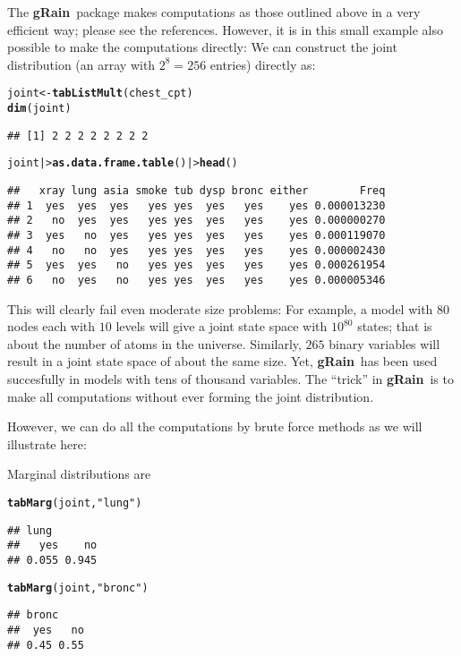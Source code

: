 \documentclass[10pt]{article}\usepackage[]{graphicx}\usepackage[]{xcolor}
\makeatletter
\newcommand{\hlstr}[1]{\textcolor[rgb]{0.192,0.494,0.8}{#1}}%
\newcommand{\hlstd}[1]{\textcolor[rgb]{0.345,0.345,0.345}{#1}}%
\newcommand{\hlkwb}[1]{\textcolor[rgb]{0.69,0.353,0.396}{#1}}%
\newcommand{\hlkwd}[1]{\textcolor[rgb]{0.737,0.353,0.396}{\textbf{#1}}}%
\newenvironment{kframe}{%
 \def\at@end@of@kframe{}%
 \ifinner\ifhmode%
  \def\at@end@of@kframe{\end{minipage}}%
  \begin{minipage}{\columnwidth}%
 \fi\fi%
 \def\FrameCommand##1{\hskip\@totalleftmargin \hskip-\fboxsep
 \colorbox{shadecolor}{##1}\hskip-\fboxsep
     \hskip-\linewidth \hskip-\@totalleftmargin \hskip\columnwidth}%
 \MakeFramed {\advance\hsize-\width
   \@totalleftmargin\z@ \linewidth\hsize
   \@setminipage}}%
 {\par\unskip\endMakeFramed%
 \at@end@of@kframe}
\newenvironment{knitrout}{}{} %
\def\grbn{{\bf gRain}}
\makeatother
\begin{document}
The \grbn\ package makes computations as those outlined above in a
very efficient way; please see the references.  However, it is in this
small example also possible to make the computations directly: We can
construct the joint distribution (an array with $2^8=256$ entries) directly as:
\begin{knitrout}
\color{fgcolor}\begin{kframe}
\begin{alltt}
\hlstd{joint} \hlkwb{<-} \hlkwd{tabListMult}\hlstd{(chest_cpt)}
\hlkwd{dim}\hlstd{(joint)}
\end{alltt}
\begin{verbatim}
## [1] 2 2 2 2 2 2 2 2
\end{verbatim}
\begin{alltt}
\hlstd{joint  |>} \hlkwd{as.data.frame.table}\hlstd{() |>} \hlkwd{head}\hlstd{()}
\end{alltt}
\begin{verbatim}
##   xray lung asia smoke tub dysp bronc either        Freq
## 1  yes  yes  yes   yes yes  yes   yes    yes 0.000013230
## 2   no  yes  yes   yes yes  yes   yes    yes 0.000000270
## 3  yes   no  yes   yes yes  yes   yes    yes 0.000119070
## 4   no   no  yes   yes yes  yes   yes    yes 0.000002430
## 5  yes  yes   no   yes yes  yes   yes    yes 0.000261954
## 6   no  yes   no   yes yes  yes   yes    yes 0.000005346
\end{verbatim}
\end{kframe}
\end{knitrout}

This will clearly fail even moderate size problems: For example, a
model with $80$
nodes each with $10$
levels will give a joint state space with $10^{80}$
states; that is about the number of atoms in the universe. Similarly,
$265$
binary variables will result in a joint state space of about the same
size. Yet, \grbn\ has been used succesfully in models with tens of
thousand variables.  The ``trick'' in \grbn\ is to make all
computations without ever forming the joint distribution. 

However, we
can do all the computations by brute force methods as we will
illustrate here:

Marginal distributions are
\begin{knitrout}
\color{fgcolor}\begin{kframe}
\begin{alltt}
\hlkwd{tabMarg}\hlstd{(joint,} \hlstr{"lung"}\hlstd{)}
\end{alltt}
\begin{verbatim}
## lung
##   yes    no 
## 0.055 0.945
\end{verbatim}
\begin{alltt}
\hlkwd{tabMarg}\hlstd{(joint,} \hlstr{"bronc"}\hlstd{)}
\end{alltt}
\begin{verbatim}
## bronc
##  yes   no 
## 0.45 0.55
\end{verbatim}
\end{kframe}
\end{knitrout}
\end{document}
